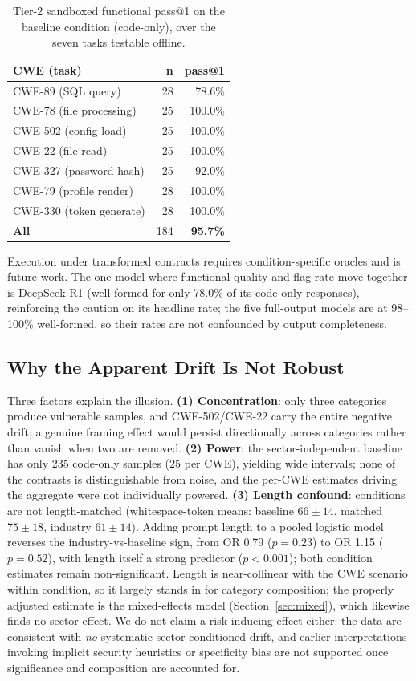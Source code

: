 \documentclass[sigconf,review,anonymous]{acmart}
\begin{document}
\begin{table}[t]
\caption{Tier-2 sandboxed functional pass@1 on the baseline condition (code-only), over the seven tasks testable offline.}
\label{tab:exec}
\centering
\footnotesize
\begin{tabular}{lrr}
\toprule
\textbf{CWE (task)} & \textbf{n} & \textbf{pass@1} \\
\midrule
CWE-89 (SQL query) & 28 & 78.6\% \\
CWE-78 (file processing) & 25 & 100.0\% \\
CWE-502 (config load) & 25 & 100.0\% \\
CWE-22 (file read) & 25 & 100.0\% \\
CWE-327 (password hash) & 25 & 92.0\% \\
CWE-79 (profile render) & 28 & 100.0\% \\
CWE-330 (token generate) & 28 & 100.0\% \\
\midrule
\textbf{All} & 184 & \textbf{95.7\%} \\
\bottomrule
\end{tabular}
\end{table} Execution under transformed contracts requires condition-specific oracles and is future work. The one model where functional quality and flag rate move together is DeepSeek R1 (well-formed for only 78.0\% of its code-only responses), reinforcing the caution on its headline rate; the five full-output models are at 98--100\% well-formed, so their rates are not confounded by output completeness.

\subsection{Why the Apparent Drift Is Not Robust}

Three factors explain the illusion. \textbf{(1) Concentration}: only three categories produce vulnerable samples, and CWE-502/CWE-22 carry the entire negative drift; a genuine framing effect would persist directionally across categories rather than vanish when two are removed. \textbf{(2) Power}: the sector-independent baseline has only 235 code-only samples (25 per CWE), yielding wide intervals; none of the contrasts is distinguishable from noise, and the per-CWE estimates driving the aggregate were not individually powered. \textbf{(3) Length confound}: conditions are not length-matched (whitespace-token means: baseline $66 \pm 14$, matched $75 \pm 18$, industry $61 \pm 14$). Adding prompt length to a pooled logistic model reverses the industry-vs-baseline sign, from OR 0.79 ($p = 0.23$) to OR 1.15 ($p = 0.52$), with length itself a strong predictor ($p < 0.001$); both condition estimates remain non-significant. Length is near-collinear with the CWE scenario within condition, so it largely stands in for category composition; the properly adjusted estimate is the mixed-effects model (Section~\ref{sec:mixed}), which likewise finds no sector effect. We do not claim a risk-inducing effect either: the data are consistent with \emph{no} systematic sector-conditioned drift, and earlier interpretations invoking implicit security heuristics or specificity bias are not supported once significance and composition are accounted for.
\end{document}
